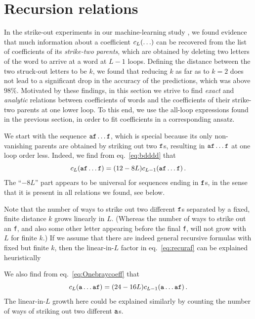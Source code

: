 \documentclass[12pt]{article}
\begin{document}
\section{Recursion relations} \label{sec:recursion}

In the strike-out experiments in our machine-learning study \citep{Cai:2024znx}, we found evidence that much information about a coefficient $c_L({\tt\dots})$ can be recovered from the list of coefficients of its \emph{strike-two parents}, which are obtained by deleting two letters of the word to arrive at a word at $L-1$ loops. Defining the distance between the two struck-out letters to be $k$, we found that reducing $k$ as far as to $k=2$ does not lead to a significant drop in the accuracy of the predictions, which was above $98\%$.
Motivated by these findings, in this section we strive to find \textit{exact} and \textit{analytic} relations between coefficients of words and the coefficients of their strike-two parents at one lower loop. 
To this end, we use the all-loop expressions found in the previous section, in order to fit coefficients in a corresponding ansatz.

We start with the sequence ${\tt af\dots f}$, which is special because its only non-vanishing parents are obtained by striking out two ${\tt f}$s, resulting in ${\tt af\dots f}$ at one loop order less.
Indeed, we find from eq.~\eqref{eq:bdddd} that
\begin{equation}
    c_L({\tt af\dots f}) = (12 - 8 L) c_{L-1}({\tt af\dots f})\,.
    \label{eq:recuraf}
\end{equation}
The ``$-8L$'' part appears to be universal for sequences ending in ${\tt f}$s, in the sense that it is present in all relations we found, see below.

Note that the number of ways to strike out two different ${\tt f}$s separated by a fixed, finite distance $k$ grows linearly in $L$. (Whereas the number of ways to strike out an {\tt f}, and also some other letter appearing before the final {\tt f}, will not grow with $L$ for finite $k$.)  If we assume that there are indeed general recursive formulas with fixed but finite $k$, then the linear-in-$L$ factor in eq.~\eqref{eq:recuraf} can be explained heuristically 

We also find from eq.~\eqref{eq:Onebraycoeff} that
\begin{equation}
    c_L({\tt a\dots a f}) = (24 - 16 L) c_{L-1}({\tt a\dots af})\,.
\end{equation}
%
The linear-in-$L$ growth here could be explained similarly by counting the number of ways of striking out two different ${\tt a}$s. 
\end{document}
